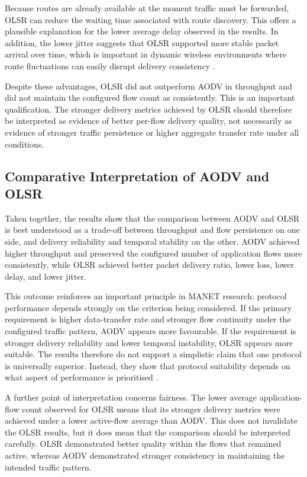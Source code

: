 \documentclass{Academic}
\begin{document}
Because routes are already available at the moment traffic must be forwarded, OLSR can reduce the waiting time associated with route discovery. This offers a plausible explanation for the lower average delay observed in the results. In addition, the lower jitter suggests that OLSR supported more stable packet arrival over time, which is important in dynamic wireless environments where route fluctuations can easily disrupt delivery consistency \parencite{spaho2013,wheeb2023,sarkar2025}.

Despite these advantages, OLSR did not outperform AODV in throughput and did not maintain the configured flow count as consistently. This is an important qualification. The stronger delivery metrics achieved by OLSR should therefore be interpreted as evidence of better per-flow delivery quality, not necessarily as evidence of stronger traffic persistence or higher aggregate transfer rate under all conditions.

\subsection{Comparative Interpretation of AODV and OLSR}

Taken together, the results show that the comparison between AODV and OLSR is best understood as a trade-off between throughput and flow persistence on one side, and delivery reliability and temporal stability on the other. AODV achieved higher throughput and preserved the configured number of application flows more consistently, while OLSR achieved better packet delivery ratio, lower loss, lower delay, and lower jitter.

This outcome reinforces an important principle in MANET research: protocol performance depends strongly on the criterion being considered. If the primary requirement is higher data-transfer rate and stronger flow continuity under the configured traffic pattern, AODV appears more favourable. If the requirement is stronger delivery reliability and lower temporal instability, OLSR appears more suitable. The results therefore do not support a simplistic claim that one protocol is universally superior. Instead, they show that protocol suitability depends on what aspect of performance is prioritised \parencite{radha2018,kurniawan2020,sarkar2025,selim2025}.

A further point of interpretation concerns fairness. The lower average application-flow count observed for OLSR means that its stronger delivery metrics were achieved under a lower active-flow average than AODV. This does not invalidate the OLSR results, but it does mean that the comparison should be interpreted carefully. OLSR demonstrated better quality within the flows that remained active, whereas AODV demonstrated stronger consistency in maintaining the intended traffic pattern.
\end{document}
